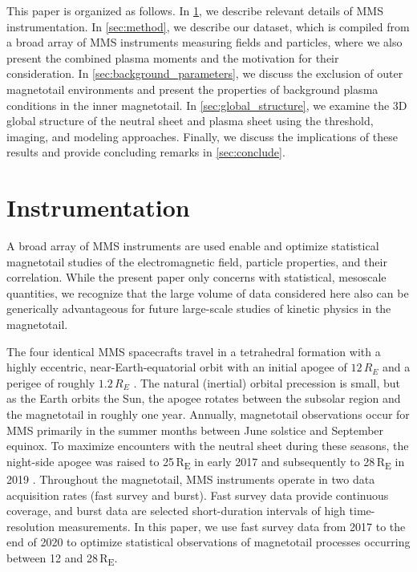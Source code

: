 \documentclass[draft]{agujournal2019}
\begin{document}
This paper is organized as follows. In \cref{sec:instrumentation}, we describe relevant details of MMS instrumentation. In \cref{sec:method}, we describe our dataset, which is compiled from a broad array of MMS instruments measuring fields and particles, where we also present the combined plasma moments and the motivation for their consideration. In \cref{sec:background_parameters}, we discuss the exclusion of outer magnetotail environments and present the properties of background plasma conditions in the inner magnetotail. In \cref{sec:global_structure}, we examine the 3D global structure of the neutral sheet and plasma sheet using the threshold, imaging, and modeling approaches. Finally, we discuss the implications of these results and provide concluding remarks in \cref{sec:conclude}.

\section{Instrumentation}\label{sec:instrumentation}

A broad array of MMS instruments are used enable and optimize statistical magnetotail studies of the electromagnetic field, particle properties, and their correlation. While the present paper only concerns with statistical, mesoscale quantities, we recognize that the large volume of data considered here also can be generically advantageous for future large-scale studies of kinetic physics in the magnetotail.

The four identical MMS spacecrafts travel in a tetrahedral formation with a highly eccentric, near-Earth-equatorial orbit with an initial apogee of ${12\,\si{R_E}}$ and a perigee of roughly $1.2\,\si{R_E}$ \cite{Fuselier2016}. The natural (inertial) orbital precession is small, but as the Earth orbits the Sun, the apogee rotates between the subsolar region and the magnetotail in roughly one year.  Annually, magnetotail observations occur for MMS primarily in the summer months between June solstice and September equinox. To maximize encounters with the neutral sheet during these seasons, the night-side apogee was raised to 25\,\si{R_E} in early 2017 and subsequently to 28\,\si{R_E} in 2019 \cite{Tedla2018}. Throughout the magnetotail, MMS instruments operate in two data acquisition rates (fast survey and burst). Fast survey data provide continuous coverage, and burst data are selected short-duration intervals of high time-resolution measurements. In this paper, we use fast survey data from 2017 to the end of 2020 to optimize statistical observations of magnetotail processes occurring between 12 and 28\,\si{R_E}. 
\end{document}
